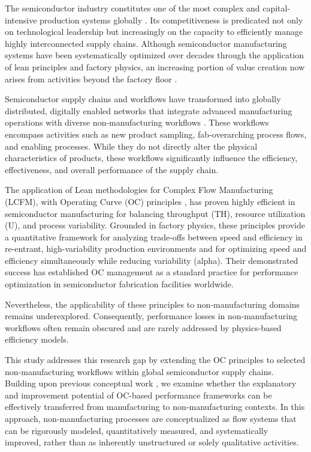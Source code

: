 \documentclass[preprint,12pt,authoryear]{elsarticle}
\begin{document}
The semiconductor industry constitutes one of the most complex and capital-intensive production systems globally \citep{monch2013}. Its competitiveness is predicated not only on technological leadership but increasingly on the capacity to efficiently manage highly interconnected supply chains. Although semiconductor manufacturing systems have been systematically optimized over decades through the application of lean principles and factory physics, an increasing portion of value creation now arises from activities beyond the factory floor \citep{LauterEhmReiner2025}.

Semiconductor supply chains and workflows have transformed into globally distributed, digitally enabled networks that integrate advanced manufacturing operations with diverse non-manu\-facturing workflows \citep{Felsberger2022}. These workflows encompass activities such as new product sampling, fab-overarching process flows, and enabling processes. While they do not directly alter the physical characteristics of products, these workflows significantly influence the efficiency, effectiveness, and overall performance of the supply chain.

The application of Lean methodologies for Complex Flow Manufacturing (LCFM), with Operating Curve (OC) principles \citep{HackmanLeachman1989}, has proven highly efficient \citep{ehm2011, fayed2008} in semiconductor manufacturing for balancing throughput (TH), resource utilization (U), and process variability. Grounded in factory physics, these principles provide a quantitative framework for analyzing trade-offs between speed and efficiency in re-entrant, high-variability production environments \citep{monch2013} and for optimizing speed and efficiency simultaneously while reducing variability (alpha). Their demonstrated success has established OC management as a standard practice for performance optimization in semiconductor fabrication facilities worldwide.

Nevertheless, the applicability of these principles to non-manufacturing domains remains underexplored. Consequently, performance losses in non-manufacturing workflows often remain obscured and are rarely addressed by physics-based efficiency models.

This study addresses this research gap by extending the OC principles to selected non-manu\-facturing workflows within global semiconductor supply chains. Building upon previous conceptual work \citep{LauterEhmReiner2025}, we examine whether the explanatory and improvement potential of OC-based performance frameworks can be effectively transferred from manufacturing to non-manufacturing contexts. In this approach, non-manufacturing processes are conceptualized as flow systems that can be rigorously modeled, quantitatively measured, and systematically improved, rather than as inherently unstructured or solely qualitative activities.
\end{document}
